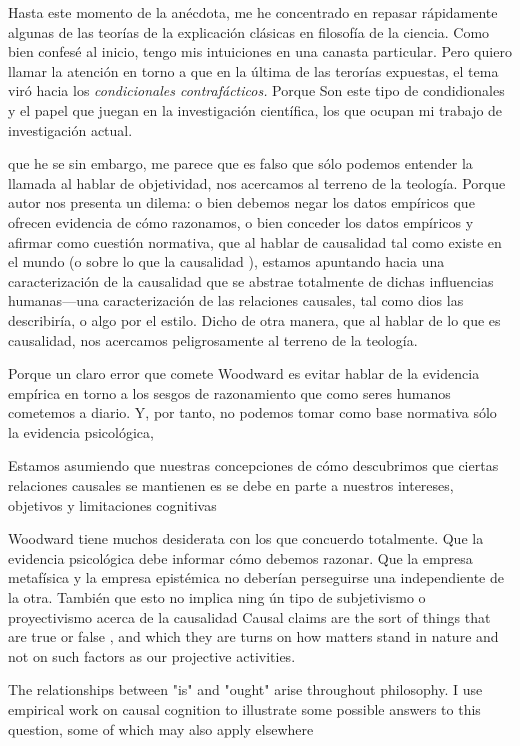 \noindent Hasta este momento de la anécdota, me he
concentrado en repasar rápidamente algunas de las teorías de
la explicación clásicas en filosofía de la ciencia. Como
bien confesé al inicio, tengo mis intuiciones en una canasta
particular. Pero quiero llamar la atención en torno a que en
la última de las terorías expuestas, el tema viró hacia los
\emph{condicionales contrafácticos.} Porque Son este tipo de
condidionales y el papel que juegan en la investigación
científica, los que ocupan mi trabajo de investigación
actual.

que he se sin embargo, me parece que es falso que sólo podemos
entender la llamada  al hablar de
objetividad, nos acercamos al terreno de la teología. Porque
autor nos presenta un dilema: o bien debemos negar los datos
empíricos que ofrecen evidencia de cómo razonamos, o bien
conceder los datos empíricos y afirmar como cuestión
normativa, que al hablar de causalidad tal como existe en el
mundo (o sobre lo que la causalidad ), estamos
apuntando hacia una caracterización de la causalidad que se
abstrae totalmente de dichas influencias humanas---una
caracterización de las relaciones causales, tal como dios
las describiría, o algo por el estilo. Dicho de otra manera, 
que al hablar de lo que es causalidad, nos acercamos
peligrosamente al terreno de la teología. 

Porque un claro error que comete Woodward es evitar hablar
de la evidencia empírica en torno a los sesgos de
razonamiento que como seres humanos cometemos a diario. Y,
por tanto, no podemos tomar como base normativa sólo la
evidencia psicológica, 

Estamos asumiendo que nuestras concepciones de cómo
descubrimos que ciertas relaciones causales se mantienen es
se debe en parte a nuestros intereses, objetivos y
limitaciones cognitivas

Woodward tiene muchos desiderata con los que concuerdo
totalmente. Que la evidencia psicológica debe informar cómo
debemos razonar. Que la empresa metafísica y la empresa
epistémica no deberían perseguirse una independiente de la
otra. También que esto no implica ning ún tipo de
subjetivismo o proyectivismo acerca de la causalidad
Causal claims are the sort of things that are true or false
, and which they are turns on how matters stand in nature
and not on such factors as our projective activities. 

The relationships between "is" and "ought" arise throughout
philosophy. I use empirical work on causal cognition to
illustrate some possible answers to this question, some of
which may also apply elsewhere

